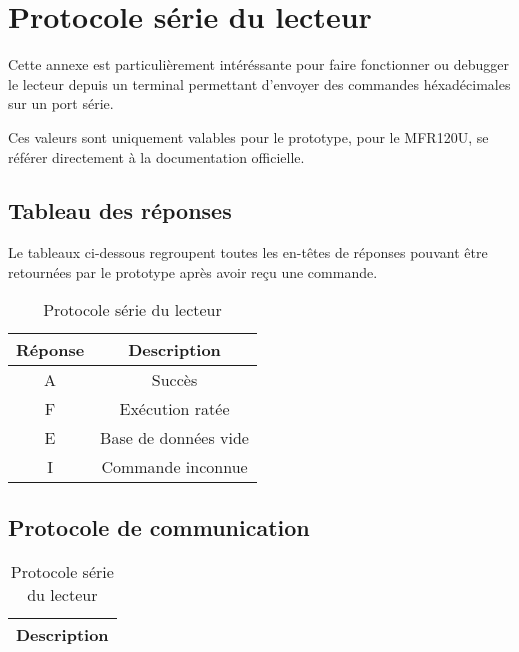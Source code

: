 \chapter{Protocole série du lecteur}

    Cette annexe est particulièrement intéréssante pour faire fonctionner ou debugger
le lecteur depuis un terminal permettant d'envoyer des commandes héxadécimales sur
un port série. 

    Ces valeurs sont uniquement valables pour le prototype, pour le MFR120U, se 
référer directement à la documentation officielle.

\section{Tableau des réponses}

    Le tableaux ci-dessous regroupent toutes les en-têtes de réponses pouvant être
retournées par le prototype après avoir reçu une commande.

\begin{table}[h]
\begin{center}

    \begin{tabular}{|c|c|}
    \hline
    Réponse & Description \\
    \hline
    A & Succès \\
    \hline
    F & Exécution ratée \\
    \hline
    E & Base de données vide\\
    \hline
    I & Commande inconnue\\
    \hline
    \end{tabular}

\end{center}
\caption{Protocole série du lecteur}
\label{Protocole série du lecteur}
\end{table}






\section{Protocole de communication}

\begin{table}[h]
\begin{center}

    \begin{tabular}{|c|}
    \hline
    Description \\
    \hline
    \end{tabular}

\end{center}
\caption{Protocole série du lecteur}
\label{Protocole série du lecteur}
\end{table}

